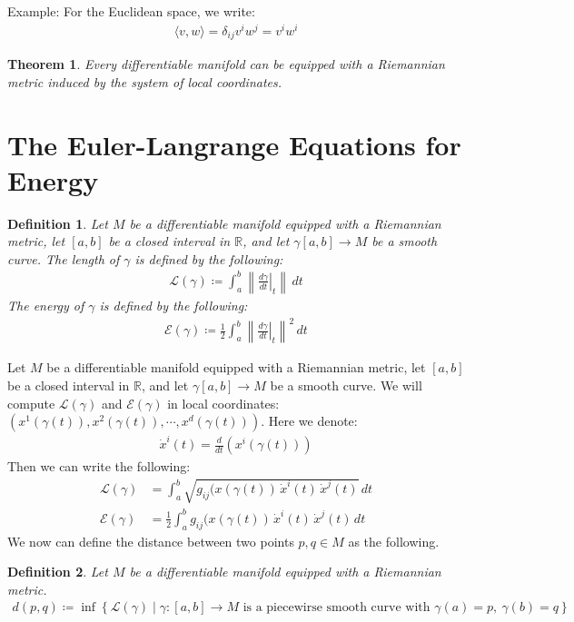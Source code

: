 \documentclass[11pt]{book}
\theoremstyle{break}
\theoremstyle{break}
\newtheorem{thm}{Theorem}[section]
\newtheorem{defn}{Definition}[corL]
\newcommand{\R}{\mathbb{R}}
\newcommand{\example}{\color{green}Example: \color{black}}
\begin{document}
\example For the Euclidean space, we write:
\begin{align*}
\langle v, w\rangle = \delta_{ij} v^i w^j = v^iw^i
\end{align*}

\begin{thm}
Every differentiable manifold can be equipped with a Riemannian metric induced by the system of local coordinates. 
\end{thm}

\newpage
\section[The Euler-Langrange Equations for Energy]{\color{red}The Euler-Langrange Equations for Energy \color{black}}
\begin{defn}
Let $M$ be a differentiable manifold equipped with a Riemannian metric, let $[a,b]$ be a closed interval in $\R$, and let $\gamma[a,b] \to M$ be a smooth curve. The length of $\gamma$ is defined by the following:
\begin{align*}
\mathcal{L}(\gamma) \coloneqq \int_a^b \left\| \left.\frac{d\gamma}{dt}\right|_t \right\| \, dt
\end{align*}
The energy of $\gamma$ is defined by the following:
\begin{align*}
\mathcal{E}(\gamma) \coloneqq \frac{1}{2}\int_a^b \left\| \left.\frac{d\gamma}{dt}\right|_t \right\|^2 \, dt
\end{align*}
\end{defn}
Let $M$ be a differentiable manifold equipped with a Riemannian metric, let $[a,b]$ be a closed interval in $\R$, and let $\gamma[a,b] \to M$ be a smooth curve. We will compute $\mathcal{L}(\gamma)$ and $\mathcal{E}(\gamma)$ in local coordinates: $(x^1(\gamma(t)),x^2(\gamma(t)),\cdots, x^d(\gamma(t)))$. Here we denote:
\begin{align*}
\dot{x}^i(t) = \frac{d}{dt}\left( x^i(\gamma(t))\right)
\end{align*}
Then we can write the following:
\begin{align*}
\mathcal{L}(\gamma) &= \int_a^b \sqrt{g_{ij}(x(\gamma(t))\, \dot{x}^i(t)\, \dot{x}^j(t)} \, dt\\
\mathcal{E}(\gamma) &=\frac{1}{2} \int_a^b g_{ij}(x(\gamma(t)) \, \dot{ x}^i(t) \, \dot{x}^j(t)\, dt
\end{align*} 
We now can define the distance between two points $p,q \in M$ as the following.
\begin{defn}
Let $M$ be a differentiable manifold equipped with a Riemannian metric.
\begin{align*}
d(p,q)\coloneqq \inf\left\{ \mathcal{L}(\gamma) \mid \gamma:[a,b]\to M  \text{ is a piecewirse smooth curve with }\gamma(a) = p, \ \gamma(b) = q\right\}
\end{align*}
\end{defn}
\end{document}
